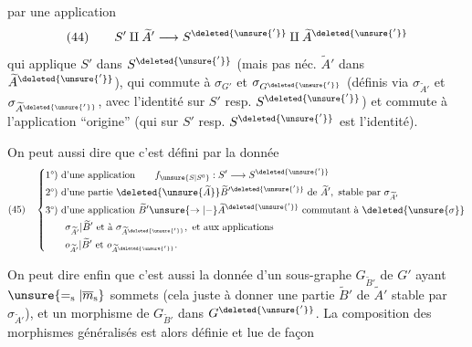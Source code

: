 par une application
\[
(44)\qquad S'\amalg\widetilde A'\longrightarrow S^{\deleted{\unsure{'}}}\amalg\widetilde A^{\deleted{\unsure{'}}}
\]
qui applique $S'$ dans $S^{\deleted{\unsure{'}}}$ (mais pas néc. $\widetilde A'$ dans $\widetilde A^{\deleted{\unsure{'}}}$), qui commute à $\sigma_{G'}$ et $\sigma_{G^{\deleted{\unsure{'}}}}$ (définis via $\sigma_{\widetilde A'}$ et $\sigma_{\widetilde A^{\deleted{\unsure{'}}}}$, avec l'identité sur $S'$ resp. $S^{\deleted{\unsure{'}}}$) et commute à l'application ``origine'' (qui sur $S'$ resp. $S^{\deleted{\unsure{'}}}$ est l'identité).

On peut aussi dire que c'est défini par la donnée
\[
(45)\quad\left\{\begin{aligned}
&\text{1°) d'une application}\qquad f_{\unsure{S|S^0}}:S'\longrightarrow S^{\deleted{\unsure{'}}}\\
&\text{2°) d'une partie }\deleted{\unsure{\widetilde A}}\widetilde B'^{\deleted{\unsure{'}}}\text{ de }\widetilde A',\text{ stable par }\sigma_{\widetilde A'}\\
&\text{3°) d'une application }\widetilde B'\unsure{\to|{-}}\widetilde A^{\deleted{\unsure{'}}}\text{ commutant à }\deleted{\unsure{\sigma}}\\
&\qquad\sigma_{\widetilde A'}|\widetilde B'\text{ et à }\sigma_{\widetilde A^{\deleted{\unsure{'}}}},\text{ et aux applications}\\
&\qquad o_{\widetilde A'}|\widetilde B'\text{ et }o_{\widetilde A^{\deleted{\unsure{'}}}}.
\end{aligned}\right.
\]

On peut dire enfin que c'est aussi la donnée d'un sous-graphe $G_{\widetilde B'}$ de $G'$ ayant $\unsure{=_{\mathrm s}|\overline m_{\mathrm s}}$ sommets (cela  juste  à donner une partie $\widetilde B'$ de $\widetilde A'$ stable par $\sigma_{\widetilde A'}$), et un morphisme de $G_{\widetilde B'}$ dans $G^{\deleted{\unsure{'}}}$. La composition des morphismes généralisés est alors définie et lue de façon
